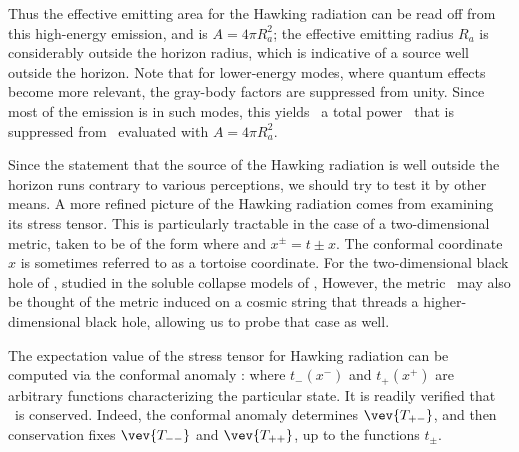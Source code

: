 Thus  the effective emitting area for the Hawking radiation can be read off from this high-energy emission, and is $A=4\pi R_a^2$; the effective emitting radius $R_a$ is considerably outside the horizon radius, which is indicative of a source well outside the horizon.
Note that for lower-energy modes, where quantum effects become more relevant, the gray-body factors are suppressed from unity.  Since most of the emission is in such modes, this yields \Page\ a total power \pagerate\ that is suppressed from \SB\ evaluated with $A=4\pi R_a^2$.

Since the statement that the source of the Hawking radiation is well outside the horizon runs contrary to various perceptions, we should try to test it by other means.  A more refined picture of the Hawking radiation comes from examining its stress tensor.  This is particularly tractable in the case of a two-dimensional metric, taken to be of the form
%
\eqn{}
%
where 
%
\eqn{}
%
and $x^\pm=t\pm x$.  
The conformal coordinate $x$ is sometimes referred to as a tortoise coordinate.  For the two-dimensional black hole of \Witt, studied in the soluble collapse models of , 
%
\eqn{}
%
However, the metric \tdmet\ may also be thought of the metric induced on a cosmic string that threads a higher-dimensional black hole, allowing us to probe that case as well.

The expectation value of the stress tensor for Hawking radiation can be computed via the conformal anomaly :
%
\eqn{}
where $t_-(x^-)$ and $t_+(x^+)$ are arbitrary functions characterizing the particular state.  It is readily verified that \stress\ is conserved.  Indeed, the conformal anomaly determines $\vev{T_{+-}}$, and then conservation fixes $\vev {T_{--}}$ and $\vev{T_{++}}$, up to the functions $t_\pm$.


